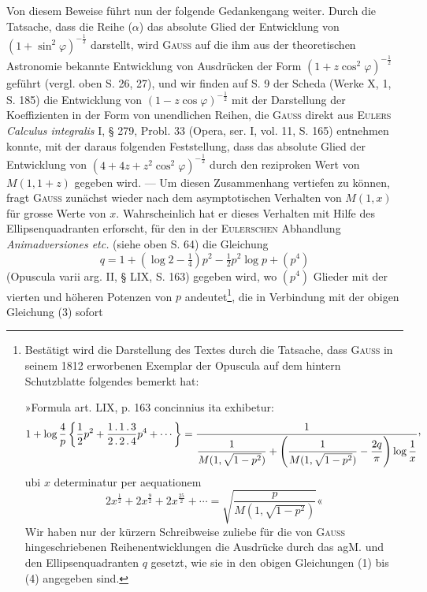 \par\clearpage{}
\HistoricalFoot{}{9\textsuperscript{\(\ast\)}}
\indent Von diesem Beweise führt nun der folgende Gedankengang weiter. Durch
die Tatsache, dass die Reihe (\(\alpha\)) das absolute Glied der Entwicklung von
\((1+\sin^2\varphi)^{-\frac12}\) darstellt, wird \textsc{Gauss} auf die ihm aus der theoretischen Astronomie
bekannte Entwicklung von Ausdrücken der Form \((1+z\cos^2\varphi)^{-\frac12}\) geführt
(vergl. oben S. 26, 27), und wir finden auf S. 9 der Scheda (Werke X, 1,
S. 185) die Entwicklung von \((1-z\cos\varphi)^{-\frac12}\) mit der Darstellung der Koeffizienten
in der Form von unendlichen Reihen, die \textsc{Gauss} direkt aus \textsc{Eulers}
\textit{Calculus integralis} I, § 279, Probl. 33 (Opera, ser. I, vol. 11, S. 165) entnehmen
konnte, mit der daraus folgenden Feststellung, dass das absolute Glied der
Entwicklung von \((4+4z+z^2\cos^2\varphi)^{-\frac12}\) durch den reziproken Wert von \(M(1,1+z)\)
gegeben wird. — Um diesen Zusammenhang vertiefen zu können, fragt \textsc{Gauss}
zunächst wieder nach dem asymptotischen Verhalten von \(M(1,x)\) für grosse
Werte von \(x\). Wahrscheinlich hat er dieses Verhalten mit Hilfe des Ellipsenquadranten
erforscht, für den in der \textsc{Eulerschen} Abhandlung \textit{Animadversiones
etc.} (siehe oben S. 64) die Gleichung
\[
q=1+(\log2-\tfrac14)p^2-\tfrac12p^2\log p+(p^4)
\]
\noindent (Opuscula varii arg. II, § LIX, S. 163) gegeben wird, wo \((p^4)\) Glieder mit
der vierten und höheren Potenzen von \(p\) andeutet\footnote{Bestätigt wird die Darstellung des Textes durch die Tatsache, dass \textsc{Gauss} in seinem 1812 erworbenen Exemplar der Opuscula auf dem hintern Schutzblatte folgendes bemerkt hat:

»Formula art. LIX, p. 163 concinnius ita exhibetur:
\[
1+\log\frac4p\left\{\frac12p^2+\frac{1\,.\,1\,.\,3}{2\,.\,2\,.\,4}p^4+\cdots\right\}
=\frac1{\dfrac1{M(1,\sqrt{1-p^2})}+\left(\dfrac1{M(1,\sqrt{1-p^2})}-\dfrac{2q}\pi\right)\log\dfrac1x}\mathpunct{\vcenter{\hbox{,}}}
\]
ubi \(x\) determinatur per aequationem
\[
2x^{\frac12}+2x^{\frac92}+2x^{\frac{25}2}+\cdots=\sqrt{\frac p{M(1,\sqrt{1-p^2})}}\text{«}
\]
Wir haben nur der kürzern Schreibweise zuliebe für die von \textsc{Gauss} hingeschriebenen Reihenentwicklungen die Ausdrücke durch das agM. und den Ellipsenquadranten \(q\) gesetzt, wie sie in den obigen Gleichungen (1) bis (4) angegeben sind.}, die in Verbindung mit
der obigen Gleichung (3) sofort
\begingroup\makeatletter\tagsleft@true\let\veqno\leqno\makeatother
